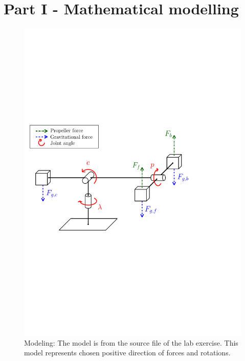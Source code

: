 
\section{Part I - Mathematical modelling} \label{sec:part1}
\begin{figure}[h!] 
    \begin{center}
    \includegraphics[scale=0.65]{Figures/forces.pdf}
    \caption{Modeling: The model is from the source file of the lab exercise. This model represents chosen positive direction of forces and rotations.} 
    \label{fig:helic_model}  
    \end{center}
\end{figure}
